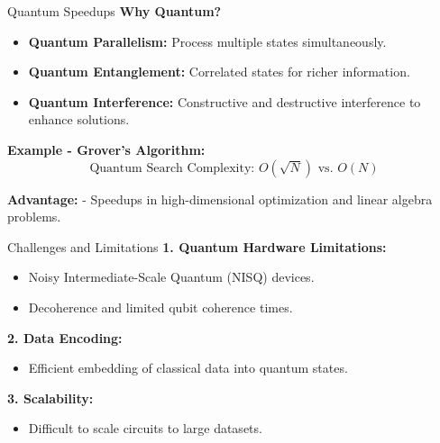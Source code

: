 \documentclass{beamer}
\begin{document}
\begin{frame}{Quantum Speedups}
\textbf{Why Quantum?}
\begin{itemize}
    \item \textbf{Quantum Parallelism:} Process multiple states simultaneously.
    \item \textbf{Quantum Entanglement:} Correlated states for richer information.
    \item \textbf{Quantum Interference:} Constructive and destructive interference to enhance solutions.
\end{itemize}

\textbf{Example - Grover's Algorithm:}
\[
\text{Quantum Search Complexity: } O(\sqrt{N}) \text{ vs. } O(N)
\]

\textbf{Advantage:}
- Speedups in high-dimensional optimization and linear algebra problems.
\end{frame}

\begin{frame}{Challenges and Limitations}
\textbf{1. Quantum Hardware Limitations:}
\begin{itemize}
    \item Noisy Intermediate-Scale Quantum (NISQ) devices.
    \item Decoherence and limited qubit coherence times.
\end{itemize}

\textbf{2. Data Encoding:}
\begin{itemize}
    \item Efficient embedding of classical data into quantum states.
\end{itemize}

\textbf{3. Scalability:}
\begin{itemize}
    \item Difficult to scale circuits to large datasets.
\end{itemize}
\end{frame}
\end{document}
